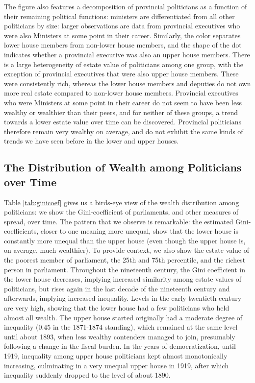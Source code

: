     The figure also features a decomposition of provincial politicians as a function of their remaining political functions: ministers are differentiated from all other politicians by size: larger observations are data from provincial executives who were also Ministers at some point in their career. Similarly, the color separates lower house members from non-lower house members, and the shape of the dot indicates whether a provincial executive was also an upper house members. There is a large heterogeneity of estate value of politicians among one group, with the exception of provincial executives that were also upper house members. These were consistently rich, whereas the lower house members and deputies do not own more real estate compared to non-lower house members. Provincial executives who were Ministers at some point in their career do not seem to have been less wealthy or wealthier than their peers, and for neither of these groups, a trend towards a lower estate value over time can be discovered. Provincial politicians therefore remain very wealthy on average, and do not exhibit the same kinds of trends we have seen before in the lower and upper houses. 

\subsection{The Distribution of Wealth among Politicians over Time}

    Table \ref{tab:ginicoef} gives us a birds-eye view of the wealth distribution among politicians: we show the Gini-coefficient of parliaments, and other measures of spread, over time. The pattern that we observe is remarkable: the estimated Gini-coefficients, closer to one meaning more unequal, show that the lower house is constantly more unequal than the upper house (even though the upper house is, on average, much wealthier). To provide context, we also show the estate value of the poorest member of parliament, the 25th and 75th percentile, and the richest person in parliament. Throughout the nineteenth century, the Gini coefficient in the lower house decreases, implying increased similarity among estate values of politicians, but rises again in the last decade of the nineteenth century and afterwards, implying increased inequality. Levels in the early twentieth century are very high, showing that the lower house had a few politicians who held almost all wealth. The upper house started originally had a moderate degree of inequality (0.45 in the 1871-1874 standing), which remained at the same level until about 1893, when less wealthy contenders managed to join, presumably following a change in the fiscal burden. In the years of democratization, until 1919, inequality among upper house politicians kept almost monotonically increasing, culminating in a very unequal upper house in 1919, after which inequality suddenly dropped to the level of about 1890. 
    
